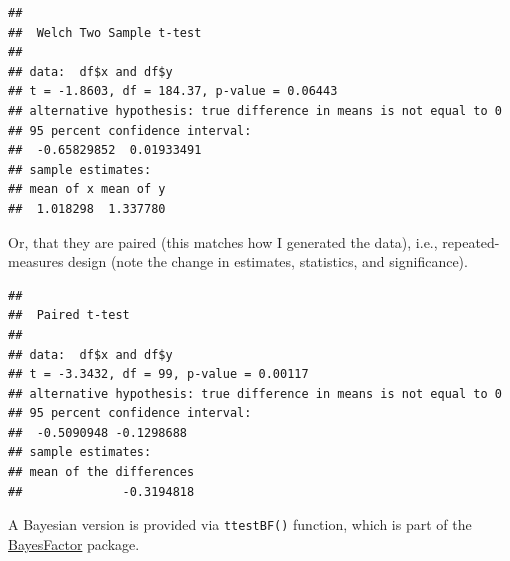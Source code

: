 \documentclass[
]{book}
\newenvironment{Shaded}{\begin{snugshade}}{\end{snugshade}}
\newcommand{\AttributeTok}[1]{\textcolor[rgb]{0.77,0.63,0.00}{#1}}
\newcommand{\ConstantTok}[1]{\textcolor[rgb]{0.00,0.00,0.00}{#1}}
\newcommand{\FunctionTok}[1]{\textcolor[rgb]{0.00,0.00,0.00}{#1}}
\newcommand{\NormalTok}[1]{#1}
\newcommand{\SpecialCharTok}[1]{\textcolor[rgb]{0.00,0.00,0.00}{#1}}
\begin{document}
\begin{Shaded}
\end{Shaded}

\begin{verbatim}
## 
##  Welch Two Sample t-test
## 
## data:  df$x and df$y
## t = -1.8603, df = 184.37, p-value = 0.06443
## alternative hypothesis: true difference in means is not equal to 0
## 95 percent confidence interval:
##  -0.65829852  0.01933491
## sample estimates:
## mean of x mean of y 
##  1.018298  1.337780
\end{verbatim}

Or, that they are paired (this matches how I generated the data), i.e., repeated-measures design (note the change in estimates, statistics, and significance).

\begin{Shaded}
\end{Shaded}

\begin{verbatim}
## 
##  Paired t-test
## 
## data:  df$x and df$y
## t = -3.3432, df = 99, p-value = 0.00117
## alternative hypothesis: true difference in means is not equal to 0
## 95 percent confidence interval:
##  -0.5090948 -0.1298688
## sample estimates:
## mean of the differences 
##              -0.3194818
\end{verbatim}

A Bayesian version is provided via \texttt{ttestBF()} function, which is part of the \href{https://richarddmorey.github.io/BayesFactor}{BayesFactor} package.

\begin{Shaded}
\end{Shaded}
\end{document}
